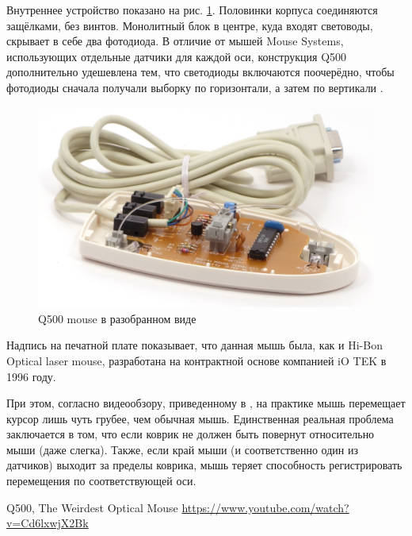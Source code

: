 \documentclass[11pt, a4paper]{article}
\begin{document}
Внутреннее устройство показано на рис. \ref{fig:q500mouseInside}.
Половинки корпуса соединяются защёлками, без винтов. Монолитный блок в центре, куда входят световоды, скрывает в себе два фотодиода. В отличие от мышей Mouse Systems, использующих отдельные датчики для каждой оси, 
конструкция Q500 дополнительно удешевлена тем, что светодиоды включаются поочерёдно, чтобы фотодиоды сначала получали выборку по горизонтали, а затем по вертикали \cite{yq}.

\begin{figure}[h]
    \centering
    \includegraphics[scale=0.8]{1996_q500_mouse/inside_30.jpg}
    \caption{Q500 mouse в разобранном виде}
    \label{fig:q500mouseInside}
\end{figure}

Надпись на печатной плате показывает, что данная мышь была, как и Hi-Bon Optical laser mouse, разработана на контрактной основе компанией iO TEK в 1996 году.

При этом, согласно видеообзору, приведенному в \cite{yq}, на практике мышь перемещает курсор лишь чуть грубее, чем обычная мышь. Единственная реальная проблема заключается в том, что если коврик не должен быть повернут относительно мыши (даже слегка). Также, если край мыши (и соответственно один из датчиков) выходит за пределы коврика, мышь теряет способность регистрировать перемещения по соответствующей оси.

\begin{thebibliography}{9}
 Q500, The Weirdest Optical Mouse \url{https://www.youtube.com/watch?v=Cd6lxwjX2Bk}
\end{thebibliography}
\end{document}
